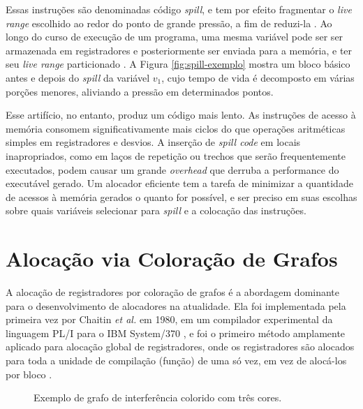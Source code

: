 \documentclass[
	12pt,				%
	openright,			%
	twoside,			%
	a4paper,			%
	tcc,			%
	]{ABNT-DC-UEL}
\begin{document}
Essas instruções são denominadas código \textit{spill}, e tem por efeito fragmentar o \textit{live range} escolhido ao redor do ponto de grande pressão, a fim de reduzi-la \cite{chaitin:81}. Ao longo do curso de execução de um programa, uma mesma variável pode ser ser armazenada em registradores e posteriormente ser enviada para a memória, e ter seu \textit{live range} particionado \cite{eisl:16}. A Figura \ref{fig:spill-exemplo} mostra um bloco básico antes e depois do \textit{spill} da variável $v_1$, cujo tempo de vida é decomposto em várias porções menores, aliviando a pressão em determinados pontos.

Esse artifício, no entanto, produz um código mais lento. As instruções de acesso à memória consomem significativamente mais ciclos do que operações aritméticas simples em registradores e desvios. A inserção de \textit{spill code} em locais inapropriados, como em laços de repetição ou trechos que serão frequentemente executados, podem causar um grande \textit{overhead} que derruba a performance do executável gerado. Um alocador eficiente tem a tarefa de minimizar a quantidade de acessos à memória gerados o quanto for possível, e ser preciso em suas escolhas sobre quais variáveis selecionar para \textit{spill} e a colocação das instruções.

\section{Alocação via Coloração de Grafos}

A alocação de registradores por coloração de grafos é a abordagem dominante para o desenvolvimento de alocadores na atualidade. Ela foi implementada pela primeira vez por Chaitin \textit{et al.} em 1980, em um compilador experimental da linguagem PL/I para o IBM System/370 \cite{chaitin:81}, e foi o primeiro método amplamente aplicado para alocação global de registradores, onde os registradores são alocados para toda a unidade de compilação (função) de uma só vez, em vez de alocá-los por bloco \cite{eisl:16}.

\begin{figure}[hbt]
    \centering
    
    \caption{Exemplo de grafo de interferência colorido com três cores.}
    \label{fig:grafo-petersen}
\end{figure}
\end{document}
